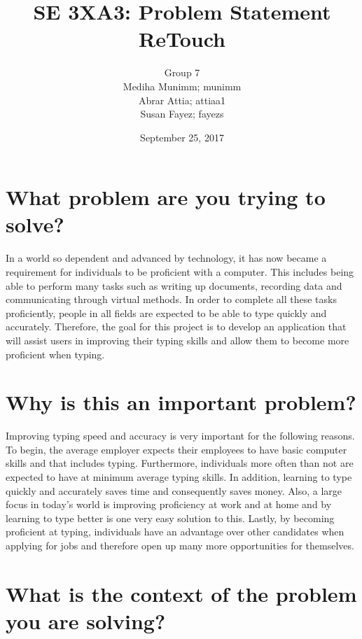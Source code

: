 \documentclass[11pt, oneside]{article}
\title{SE 3XA3: Problem Statement\\ReTouch}
\author{Group 7
		\\ Mediha Munimm; munimm
		\\ Abrar Attia; attiaa1
		\\ Susan Fayez; fayezs}
\date{September 25, 2017}
\begin{document}
\maketitle
\newpage
\tableofcontents
\newpage

\newpage
\section{What problem are you trying to solve?}

In a world so dependent and advanced by technology, it has now became a requirement for individuals to be proficient with a computer. This includes being able to perform many tasks such as writing up documents, recording data and communicating through virtual methods. In order to complete all these tasks proficiently, people in all fields are expected to be able to type quickly and accurately. Therefore, the goal for this project is to develop an application that will assist users in improving their typing skills and allow them to become more proficient when typing. 

\section{Why is this an important problem?}

Improving typing speed and accuracy is very important for the following reasons. To begin, the average employer expects their employees to have basic computer skills and that includes typing. Furthermore, individuals more often than not are expected to have at minimum average typing skills. In addition, learning to type quickly and accurately saves time and consequently saves money. Also, a large focus in today's world is improving proficiency at work and at home and by learning to type better is one very easy solution to this. Lastly, by becoming proficient at typing, individuals have an advantage over other candidates when applying for jobs and therefore open up many more opportunities for themselves.


\section{What is the context of the problem you are solving?}
\end{document}
